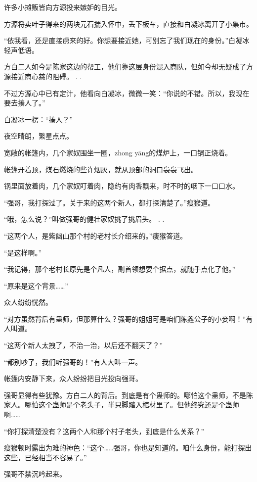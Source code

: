 
\begin{this_body}

许多小摊贩皆向方源投来嫉妒的目光。

方源将卖叶子得来的两块元石揣入怀中，丢下板车，直接和白凝冰离开了小集市。

“依我看，还是直接虏来的好。你想要接近她，可别忘了我们现在的身份。”白凝冰轻声低语。

方白二人如今是陈家这边的帮工，他们靠这层身份混入商队，但如今却无疑成了方源接近商心慈的阻碍。 . .

不过方源心中已有定计，他看向白凝冰，微微一笑：“你说的不错。所以，我现在要去揍人了。”

白凝冰一楞：“揍人？”

夜空晴朗，繁星点点。

宽敞的帐篷内，几个家奴围坐一圈，zhong yāng的煤炉上，一口锅正烧着。

帐篷开着顶，煤石燃烧的些许烟灰，就从顶部的洞口袅袅飞出。

锅里面放着肉，几个家奴盯着肉，隐约有肉香飘来，时不时的咽下一口口水。

“强哥，我打探过了。关于来的这两个新人，都打探清楚了。”瘦猴道。

“哦，怎么说？”叫做强哥的健壮家奴挑了挑眉头。 . .

“这两个人，是紫幽山那个村的老村长介绍来的。”瘦猴答道。

“是这样啊。”

“我记得，那个老村长原先是个凡人，副首领想要个据点，就随手点化了他。”

“原来是这个背景……”

众人纷纷恍然。

“对方虽然背后有蛊师，但那算什么？强哥的姐姐可是咱们陈鑫公子的小妾啊！”有人叫道。

“这两个新人太拽了，不治一治，以后还不翻天了？”

“都别吵了，我们听强哥的！”有人大叫一声。

帐篷内安静下来，众人纷纷把目光投向强哥。

强哥显得有些犹豫。方白二人的背后。到底是有个蛊师的。哪怕这个蛊师，不是陈家人。哪怕这个蛊师是个老头子，半只脚踏入棺材里了。但他终究还是个蛊师啊……

“你打探清楚没有？这两个人和那个村子老头，到底是什么关系？”

瘦猴顿时露出为难的神色：“这个……强哥，你也是知道的。咱什么身份，能打探出这些，已经相当不容易了。”

强哥不禁沉吟起来。


\end{this_body}
